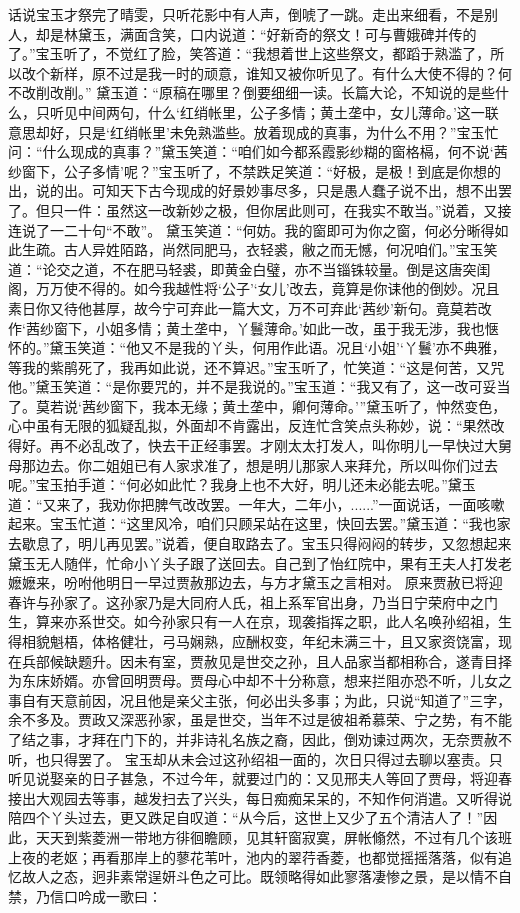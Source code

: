 \documentclass[12pt,oneside]{book}
\begin{document}
话说宝玉才祭完了晴雯，只听花影中有人声，倒唬了一跳。走出来细看，不是别人，却是林黛玉，满面含笑，口内说道：“好新奇的祭文！可与曹娥碑并传的了。”宝玉听了，不觉红了脸，笑答道：“我想着世上这些祭文，都蹈于熟滥了，所以改个新样，原不过是我一时的顽意，谁知又被你听见了。有什么大使不得的？何不改削改削。”
黛玉道：“原稿在哪里？倒要细细一读。长篇大论，不知说的是些什么，只听见中间两句，什么‘红绡帐里，公子多情；黄土垄中，女儿薄命。’这一联意思却好，只是‘红绡帐里’未免熟滥些。放着现成的真事，为什么不用？”宝玉忙问：“什么现成的真事？”黛玉笑道：“咱们如今都系霞影纱糊的窗格槅，何不说‘茜纱窗下，公子多情’呢？”宝玉听了，不禁跌足笑道：“好极，是极！到底是你想的出，说的出。可知天下古今现成的好景妙事尽多，只是愚人蠢子说不出，想不出罢了。但只一件：虽然这一改新妙之极，但你居此则可，在我实不敢当。”说着，又接连说了一二十句“不敢”。
黛玉笑道：“何妨。我的窗即可为你之窗，何必分晰得如此生疏。古人异姓陌路，尚然同肥马，衣轻裘，敝之而无憾，何况咱们。”宝玉笑道：“论交之道，不在肥马轻裘，即黄金白璧，亦不当锱铢较量。倒是这唐突闺阁，万万使不得的。如今我越性将‘公子’‘女儿’改去，竟算是你诔他的倒妙。况且素日你又待他甚厚，故今宁可弃此一篇大文，万不可弃此‘茜纱’新句。竟莫若改作‘茜纱窗下，小姐多情；黄土垄中，丫鬟薄命。’如此一改，虽于我无涉，我也惬怀的。”黛玉笑道：“他又不是我的丫头，何用作此语。况且‘小姐’‘丫鬟’亦不典雅，等我的紫鹃死了，我再如此说，还不算迟。”宝玉听了，忙笑道：“这是何苦，又咒他。”黛玉笑道：“是你要咒的，并不是我说的。”宝玉道：“我又有了，这一改可妥当了。莫若说‘茜纱窗下，我本无缘；黄土垄中，卿何薄命。’”黛玉听了，忡然变色，心中虽有无限的狐疑乱拟，外面却不肯露出，反连忙含笑点头称妙，说：“果然改得好。再不必乱改了，快去干正经事罢。才刚太太打发人，叫你明儿一早快过大舅母那边去。你二姐姐已有人家求准了，想是明儿那家人来拜允，所以叫你们过去呢。”宝玉拍手道：“何必如此忙？我身上也不大好，明儿还未必能去呢。”黛玉道：“又来了，我劝你把脾气改改罢。一年大，二年小，......”一面说话，一面咳嗽起来。宝玉忙道：“这里风冷，咱们只顾呆站在这里，快回去罢。”黛玉道：“我也家去歇息了，明儿再见罢。”说着，便自取路去了。宝玉只得闷闷的转步，又忽想起来黛玉无人随伴，忙命小丫头子跟了送回去。自己到了怡红院中，果有王夫人打发老嬷嬷来，吩咐他明日一早过贾赦那边去，与方才黛玉之言相对。
原来贾赦已将迎春许与孙家了。这孙家乃是大同府人氏，祖上系军官出身，乃当日宁荣府中之门生，算来亦系世交。如今孙家只有一人在京，现袭指挥之职，此人名唤孙绍祖，生得相貌魁梧，体格健壮，弓马娴熟，应酬权变，年纪未满三十，且又家资饶富，现在兵部候缺题升。因未有室，贾赦见是世交之孙，且人品家当都相称合，遂青目择为东床娇婿。亦曾回明贾母。贾母心中却不十分称意，想来拦阻亦恐不听，儿女之事自有天意前因，况且他是亲父主张，何必出头多事；为此，只说“知道了”三字，余不多及。贾政又深恶孙家，虽是世交，当年不过是彼祖希慕荣、宁之势，有不能了结之事，才拜在门下的，并非诗礼名族之裔，因此，倒劝谏过两次，无奈贾赦不听，也只得罢了。
宝玉却从未会过这孙绍祖一面的，次日只得过去聊以塞责。只听见说娶亲的日子甚急，不过今年，就要过门的：又见邢夫人等回了贾母，将迎春接出大观园去等事，越发扫去了兴头，每日痴痴呆呆的，不知作何消遣。又听得说陪四个丫头过去，更又跌足自叹道：“从今后，这世上又少了五个清洁人了！”因此，天天到紫菱洲一带地方徘徊瞻顾，见其轩窗寂寞，屏帐翛然，不过有几个该班上夜的老妪；再看那岸上的蓼花苇叶，池内的翠荇香菱，也都觉摇摇落落，似有追忆故人之态，迥非素常逞妍斗色之可比。既领略得如此寥落凄惨之景，是以情不自禁，乃信口吟成一歌曰：
\end{document}
